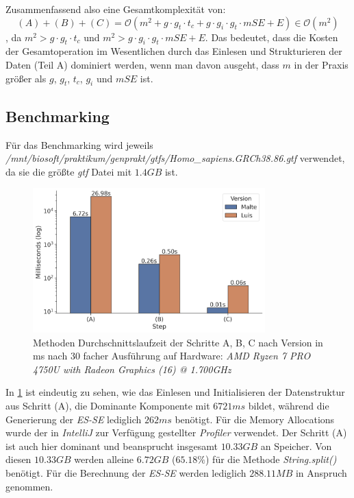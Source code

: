 \documentclass[12pt]{article}
\begin{document}
Zusammenfassend also eine Gesamtkomplexität von:
\begin{equation}
    (A) + (B) + (C) = \mathcal{O}( m^{2} + g \cdot g_{t} \cdot t_{c} + g \cdot g_{i} \cdot g_{t} \cdot mSE + E) \in \mathcal{O}(m^{2})
\end{equation}
, da $m^{2} > g \cdot g_{t} \cdot t_{c}$ und $m^{2} > g \cdot g_{i} \cdot g_{t} \cdot mSE + E$.
Das bedeutet, dass die Kosten der Gesamtoperation im Wesentlichen durch das Einlesen und Strukturieren der Daten (Teil A) dominiert werden, 
wenn man davon ausgeht, dass $m$ in der Praxis größer als $g$, $g_{t}$, $t_{c}$, $g_{i}$ und $mSE$ ist.

\subsection{Benchmarking}
Für das Benchmarking wird jeweils \textit{/mnt/biosoft/praktikum/genprakt/gtfs/Homo\_sapiens.GRCh38.86.gtf} verwendet, da sie die grö\ss te \textit{gtf} Datei mit $1.4GB$ ist.

\begin{figure}[htpb]
    \centering
    \includegraphics[width=0.8\textwidth]{./plots/benchmark_time.jpg}
    \caption{Methoden Durchschnittslaufzeit der Schritte A, B, C  nach Version in ms nach 30 facher Ausführung auf Hardware: \textit{AMD Ryzen 7 PRO 4750U with Radeon Graphics (16) @ 1.700GHz}}

    \label{fig:-plots-benchmark_time-jpg}
\end{figure}

In \ref{fig:-plots-benchmark_time-jpg} ist eindeutig zu sehen, wie das Einlesen und Initialisieren 
der Datenstruktur aus Schritt (A), die Dominante Komponente mit $6721ms$ bildet, während die Generierung der
\textit{ES-SE} lediglich $262ms$ benötigt. 
Für die Memory Allocations wurde der in \textit{IntelliJ} zur Verfügung gestellter \textit{Profiler} verwendet.
Der Schritt (A) ist auch hier dominant und beansprucht insgesamt $10.33GB$ an Speicher. 
Von diesen $10.33GB$ werden alleine $6.72GB$ ($65.18\%$) für die Methode \textit{String.split()} benötigt.
Für die Berechnung der \textit{ES-SE} werden lediglich $288.11MB$ in Anspruch genommen.
\end{document}

